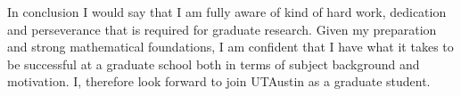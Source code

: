 \documentclass[11pt]{article}
\begin{document}
\medskip
In conclusion I would say that I am fully aware of kind of hard work, dedication and perseverance that is required for graduate research. Given my preparation and strong mathematical foundations,  I am confident that I have what it takes to be successful at a graduate school both in terms of subject background and motivation. I, therefore look forward to join UTAustin as a graduate student.
\end{document}
